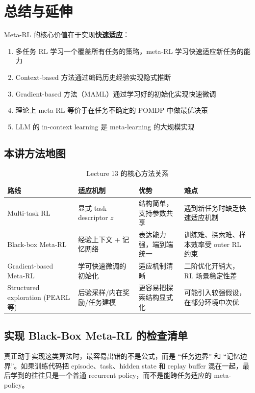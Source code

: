 \section{总结与延伸}

Meta-RL 的核心价值在于实现\textbf{快速适应}：

\begin{enumerate}
    \item 多任务 RL 学习一个覆盖所有任务的策略，meta-RL 学习快速适应新任务的能力
    \item Context-based 方法通过编码历史经验实现隐式推断
    \item Gradient-based 方法（MAML）通过学习好的初始化实现快速微调
    \item 理论上 meta-RL 等价于在任务不确定的 POMDP 中做最优决策
    \item LLM 的 in-context learning 是 meta-learning 的大规模实现
\end{enumerate}

\subsection{本讲方法地图}

\begin{table}[H]
\centering
\begin{tabular}{p{} p{} p{} p{}}
\toprule
路线 & 适应机制 & 优势 & 难点 \\
\midrule
Multi-task RL & 显式 task descriptor $z$ & 结构简单，支持参数共享 & 遇到新任务时缺乏快速适应机制 \\
Black-box Meta-RL & 经验上下文 + 记忆网络 & 表达能力强，端到端统一 & 训练难、探索难、样本效率受 outer RL 约束 \\
Gradient-based Meta-RL & 学可快速微调的初始化 & 适应机制清晰 & 二阶优化开销大，RL 场景稳定性差 \\
Structured exploration (PEARL 等) & 后验采样/内在奖励/任务建模 & 更容易把探索结构显式化 & 可能引入较强假设，在部分环境中次优 \\
\bottomrule
\end{tabular}
\caption{Lecture 13 的核心方法关系}
\end{table}

\subsection{实现 Black-Box Meta-RL 的检查清单}

真正动手实现这类算法时，最容易出错的不是公式，而是 ``任务边界'' 和 ``记忆边界''。如果训练代码把 episode、task、hidden state 和 replay buffer 混在一起，最后学到的往往只是一个普通 recurrent policy，而不是能跨任务适应的 meta-policy。


